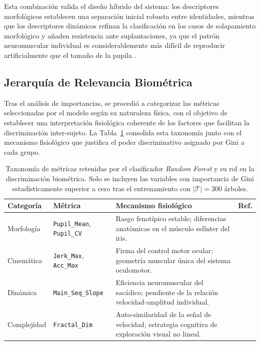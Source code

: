 Esta combinación valida el diseño híbrido del sistema: los descriptores
morfológicos establecen una separación inicial robusta entre identidades,
mientras que los descriptores dinámicos refinan la clasificación en los
casos de solapamiento morfológico y añaden resistencia ante
suplantaciones, ya que el patrón neuromuscular individual es
considerablemente más difícil de reproducir artificialmente que
el tamaño de la pupila \cite{komogortsev2010, duchowski2017}.
\subsection{Jerarquía de Relevancia Biométrica}

Tras el análisis de importancias, se procedió a categorizar las métricas
seleccionadas por el modelo según su naturaleza física, con el objetivo
de establecer una interpretación fisiológica coherente de los factores
que facilitan la discriminación inter-sujeto.
La
Tabla~\ref{tab:resumen_metricas_cap4} consolida esta taxonomía
junto con el mecanismo fisiológico que justifica el poder discriminativo
asignado por Gini a cada grupo.
\begin{table}[h!]
	\centering
	\caption[Taxonomía de métricas biométricas retenidas por \textit{Random Forest}.]{Taxonomía de métricas retenidas por el clasificador
		\textit{Random Forest} y su rol en la discriminación biométrica.
		Solo se incluyen las variables con importancia de Gini
		estadísticamente superior a cero tras el entrenamiento con
		$|\mathcal{T}|=300$ árboles.}
	\label{tab:resumen_metricas_cap4}
	\vspace{0.2cm}
	\begin{tabular}{@{}lp{3.8cm}p{5.5cm}l@{}}
		\toprule
		\textbf{Categoría} & \textbf{Métrica} &
		\textbf{Mecanismo fisiológico} & \textbf{Ref.} \\
		\midrule
		Morfología  &
		\texttt{Pupil\_Mean}, \texttt{Pupil\_CV} &
		Rasgo fenotípico estable;
		diferencias anatómicas en el músculo
		esfínter del iris. &
		\cite{beatty1982, duchowski2017} \\[4pt]
		
		Cinemática  &
		\texttt{Jerk\_Max}, \texttt{Acc\_Max} &
		Firma del control motor ocular;
		geometría muscular única
		del sistema oculomotor. &
		\cite{bahill1975, komogortsev2010} \\[4pt]
		
		Dinámica    &
		\texttt{Main\_Seq\_Slope} &
		Eficiencia neuromuscular del sacádico;
		pendiente de la
		relación velocidad-amplitud individual. &
		\cite{bahill1975} \\[4pt]
		
		Complejidad &
		\texttt{Fractal\_Dim} &
		Auto-similaridad de la señal de velocidad; estrategia
		cognitiva de exploración visual no lineal.
		&
		\cite{higuchi1988} \\
		\bottomrule
	\end{tabular}
\end{table}


